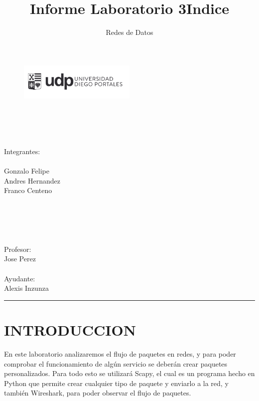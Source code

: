 \documentclass[onecolumn,12pt]{IEEEtran}
\begin{document}
\title{Informe Laboratorio 3}
\author{Redes de Datos}

\begin{figure}[h]
\includegraphics[width=0.50\textwidth]{logo_udp.png}
\label{fig:mesh1}
\\
\\
\\
\\
\\
\maketitle
\end{figure}
\begin{center}
Integrantes:\\
\hfill \\
Gonzalo Felipe\\
Andres Hernandez\\
Franco Centeno\\
\hfill \\
\hfill \\
\hfill \\
\hfill \\
\ \hfill \\
Profesor:\\
Jose Perez\\ \hfill \\
Ayudante:\\
Alexis Inzunza\\
\end{center}

\newpage
\title{Indice}
\author{ }
\maketitle
\hrule
\tableofcontents

\newpage
\section{INTRODUCCION}
En este laboratorio analizaremos el flujo de paquetes en redes, y para poder comprobar el funcionamiento de algún servicio se deberán crear paquetes personalizados. Para todo esto se utilizará Scapy, el cual es un programa hecho
en Python que permite crear cualquier tipo de paquete y enviarlo a la red, y también Wireshark, para poder observar el flujo de paquetes.
\end{document}
